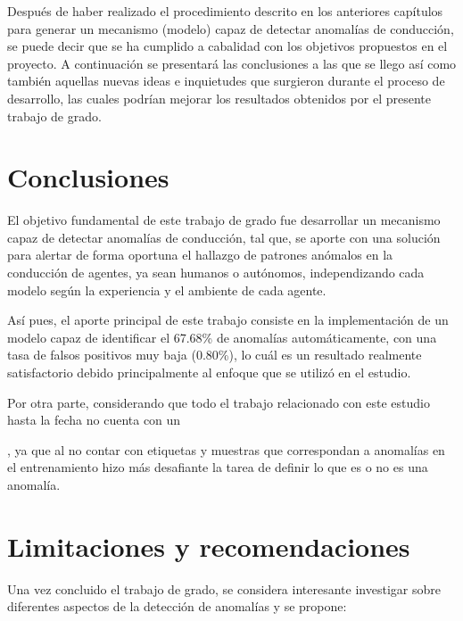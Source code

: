 
Despu\'{e}s de haber realizado el procedimiento descrito en los anteriores cap\'{i}tulos para generar un mecanismo (modelo) capaz de detectar anomal\'{i}as de conducci\'{o}n, se puede decir que se ha cumplido a cabalidad con los objetivos propuestos en el proyecto. A continuaci\'{o}n se presentar\'{a} las conclusiones a las que se llego as\'{i} como tambi\'{e}n aquellas nuevas ideas e inquietudes que surgieron durante el proceso de desarrollo, las cuales podr\'{i}an mejorar los resultados obtenidos por el presente trabajo de grado.

\section{Conclusiones}

El objetivo fundamental de este trabajo de grado fue desarrollar un mecanismo capaz de detectar anomal\'{i}as de conducci\'{o}n, tal que, se aporte con una soluci\'{o}n para alertar de forma oportuna el hallazgo de patrones an\'{o}malos en la conducci\'{o}n de agentes, ya sean humanos o aut\'{o}nomos, independizando cada modelo seg\'{u}n la experiencia y el ambiente de cada agente.

\vspace{5mm} %

As\'{i} pues, el aporte principal de este trabajo consiste en la implementaci\'{o}n de un modelo capaz de identificar el 67.68\% de anomal\'{i}as autom\'{a}ticamente, con una tasa de falsos positivos muy baja (0.80\%), lo cu\'{a}l es un resultado realmente satisfactorio debido principalmente al enfoque que se utiliz\'{o} en el estudio.

Por otra parte, considerando que todo el trabajo relacionado con este estudio hasta la fecha no cuenta con un 

, ya que al no contar con etiquetas y muestras que correspondan a anomal\'{i}as en el entrenamiento hizo m\'{a}s desafiante la tarea de definir lo que es o no es una anomal\'{i}a.

\section{Limitaciones y recomendaciones}

Una vez concluido el trabajo de grado, se considera interesante investigar sobre diferentes aspectos de la detecci\'{o}n de anomal\'{i}as y se propone:


